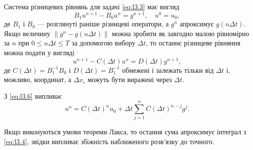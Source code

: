 Система різницевих рівнянь для задачі \eqref{eq:l3.3} має вигляд
\begin{equation}
    B_1 u^{n + 1} - B_0 u^n = g^{n + 1}, \quad u^0 = u_0,
\end{equation}
де $B_1$ і $B_0$ --- розглянуті раніше різницеві оператори, а $g^n$ апроксимує $g(n \Delta t)$. Якщо величину $\|g^n - g(n \Delta t)\|$ можна зробити як завгодно малою рівномірно за $n$ при $0 \le n \Delta t \le T$ за допомогою вибору $\Delta t$, то останнє різницеве рівняння можна подати у вигляді
\begin{equation}
    \label{eq:l3.6}
    u^{n + 1} - C(\Delta t) u^n = D(\Delta t) g^{n + 1},
\end{equation}
де $C(\Delta t) = B_1^{-1} B_0$ і $D(\Delta t) = B_1^{-1}$ обмежені і залежать тільки від $\Delta t$ і, можливо, координат, а $\Delta x_i$ можуть бути виражені через $\Delta t$. \medskip

З \eqref{eq:l3.6} випливає
\begin{equation}
    u^n = C(\Delta t)^n u_0 + \Delta t \sum_{j = 1}^n C(\Delta t)^{n - j} g^j.
\end{equation}

Якщо виконуються умови теореми Лакса, то остання сума апроксимує інтеграл з \eqref{eq:l3.4}, звідки випливає збіжність наближеного розв'язку до точного.
